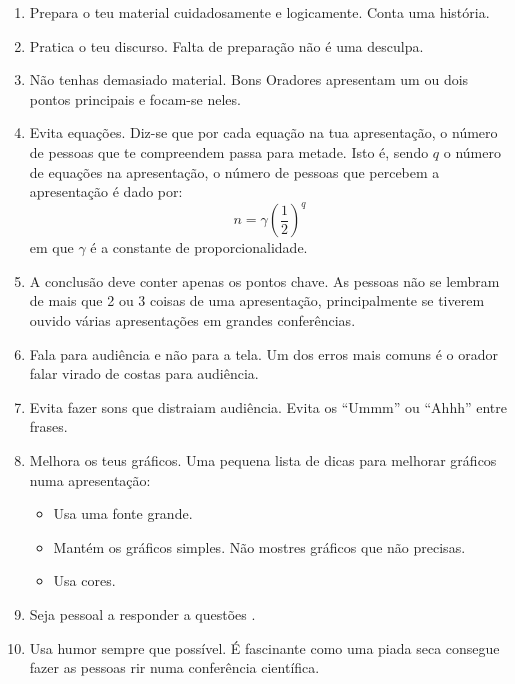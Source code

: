 \documentclass[12pt]{article}
\begin{document}
\begin{enumerate}
  \item Prepara o teu material cuidadosamente e logicamente.
  Conta uma história.
  \item Pratica o teu discurso.
  Falta de preparação não é uma desculpa.
  \item Não tenhas demasiado material.
  Bons Oradores apresentam um ou dois pontos principais e focam-se neles.
  \item Evita equações.
  Diz-se que por cada equação na tua apresentação, o número de pessoas que te compreendem passa para metade.
  Isto é, sendo $q$ o número de equações na apresentação, o número de pessoas que percebem a apresentação é dado por:
  \begin{equation}
    n = \gamma \left( \frac{1}{2} \right)^q
  \end{equation}
  em que $\gamma$ é a constante de proporcionalidade\cite{Valente1999,Boyce2010}.
  \item A conclusão deve conter apenas os pontos chave.
  As pessoas não se lembram de mais que 2 ou 3 coisas de uma apresentação, principalmente se tiverem ouvido várias apresentações em grandes conferências.
  \item Fala para audiência e não para a tela.
  Um dos erros mais comuns é o orador falar virado de costas para audiência.
  \item Evita fazer sons que distraiam audiência.
  Evita os ``Ummm'' ou ``Ahhh'' entre frases.
  \item Melhora os teus gráficos.
  Uma pequena lista de dicas para melhorar gráficos numa apresentação:
  \begin{itemize}
    \item Usa uma fonte grande.
    \item Mantém os gráficos simples.
    Não mostres gráficos que não precisas.
    \item Usa cores.
  \end{itemize}
  \item Seja pessoal a responder a questões \cite{Strang2013,Saviani1980}.
  \item Usa humor sempre que possível.
  É fascinante como uma piada seca consegue fazer as pessoas rir numa conferência científica.
\end{enumerate}

\printbibliography
\end{document}
